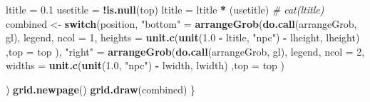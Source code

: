 \documentclass[a4paperpaper,]{article}
\newenvironment{Shaded}{\begin{snugshade}}{\end{snugshade}}
\newcommand{\KeywordTok}[1]{\textcolor[rgb]{0.13,0.29,0.53}{\textbf{#1}}}
\newcommand{\DataTypeTok}[1]{\textcolor[rgb]{0.13,0.29,0.53}{#1}}
\newcommand{\DecValTok}[1]{\textcolor[rgb]{0.00,0.00,0.81}{#1}}
\newcommand{\FloatTok}[1]{\textcolor[rgb]{0.00,0.00,0.81}{#1}}
\newcommand{\StringTok}[1]{\textcolor[rgb]{0.31,0.60,0.02}{#1}}
\newcommand{\CommentTok}[1]{\textcolor[rgb]{0.56,0.35,0.01}{\textit{#1}}}
\newcommand{\ControlFlowTok}[1]{\textcolor[rgb]{0.13,0.29,0.53}{\textbf{#1}}}
\newcommand{\OperatorTok}[1]{\textcolor[rgb]{0.81,0.36,0.00}{\textbf{#1}}}
\newcommand{\NormalTok}[1]{#1}
\begin{document}
\begin{Shaded}
\begin{Highlighting}[]
\NormalTok{  ltitle =}\StringTok{ }\FloatTok{0.1}
\NormalTok{  usetitle =}\StringTok{ }\OperatorTok{!}\KeywordTok{is.null}\NormalTok{(top)}
\NormalTok{  ltitle =}\StringTok{ }\NormalTok{ltitle }\OperatorTok{*}\StringTok{ }\NormalTok{(usetitle)}
  \CommentTok{# cat(ltitle)}
\NormalTok{  combined <-}\StringTok{ }\ControlFlowTok{switch}\NormalTok{(position,}
                     \StringTok{"bottom"}\NormalTok{ =}\StringTok{ }\KeywordTok{arrangeGrob}\NormalTok{(}\KeywordTok{do.call}\NormalTok{(arrangeGrob, gl),}
\NormalTok{                                            legend,}
                                            \DataTypeTok{ncol =} \DecValTok{1}\NormalTok{,}
                                            \DataTypeTok{heights =} \KeywordTok{unit.c}\NormalTok{(}\KeywordTok{unit}\NormalTok{(}\FloatTok{1.0} \OperatorTok{-}\StringTok{ }\NormalTok{ltitle, }\StringTok{"npc"}\NormalTok{) }\OperatorTok{-}\StringTok{ }\NormalTok{lheight, lheight)}
\NormalTok{                                            ,}\DataTypeTok{top =}\NormalTok{ top}
\NormalTok{                     ),}
                     \StringTok{"right"}\NormalTok{ =}\StringTok{ }\KeywordTok{arrangeGrob}\NormalTok{(}\KeywordTok{do.call}\NormalTok{(arrangeGrob, gl),}
\NormalTok{                                           legend,}
                                           \DataTypeTok{ncol =} \DecValTok{2}\NormalTok{,}
                                           \DataTypeTok{widths =} \KeywordTok{unit.c}\NormalTok{(}\KeywordTok{unit}\NormalTok{(}\FloatTok{1.0}\NormalTok{, }\StringTok{"npc"}\NormalTok{) }\OperatorTok{-}\StringTok{ }\NormalTok{lwidth, lwidth)}
\NormalTok{                                           ,}\DataTypeTok{top =}\NormalTok{ top}
\NormalTok{                     )}
                     
\NormalTok{  )}
  \KeywordTok{grid.newpage}\NormalTok{()}
  \KeywordTok{grid.draw}\NormalTok{(combined)}
\NormalTok{\}}
\end{Highlighting}
\end{Shaded}
\end{document}
